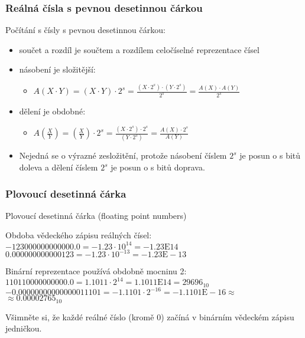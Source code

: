 \documentclass{beamer}
\begin{document}
\begin{frame}
\frametitle{Reálná čísla s pevnou desetinnou čárkou}

Počítání s čísly s pevnou desetinnou čárkou:

\begin{itemize}
\item součet a rozdíl je součtem a rozdílem celočíselné reprezentace čísel
\item násobení je složitější:
\begin{itemize}
\item $A(X \cdot Y) = (X \cdot Y ) \cdot 2^s = \frac{(X \cdot 2^s)\cdot( Y\cdot 2^s) }{2^s} = \frac{A(X) \cdot A(Y)}{2^s}$
\end{itemize}
\item dělení je obdobné:
\begin{itemize}
\item $A(\frac{X}{Y}) = (\frac{X}{Y}) \cdot 2^s = \frac{(X \cdot 2^s)\cdot2^s }{( Y\cdot 2^s)} = \frac{A(X) \cdot 2^s}{A(Y)}$
\end{itemize}
\item Nejedná se o výrazné zesložitění, protože násobení číslem $2^s$ je posun o s bitů doleva a dělení číslem $2^s$ je posun o s bitů doprava.
\end{itemize}



\end{frame}


\begin{frame}
\frametitle{Plovoucí desetinná čárka}

Plovoucí desetinná čárka (floating point numbers)

\bigskip

Obdoba vědeckého zápisu reálných čísel:
$-123 000 000 000 000.0 = -1.23 \cdot 10^{14} = -1.23\text{E} 14$\\
$0.000 000 000 000 123 = -1.23 \cdot 10^{-13} = -1.23\text{E}-13$\\

\bigskip

Binární reprezentace používá obdobně mocninu 2:\\
$110 1100 0000 0000.0 = 1.1011 \cdot 2^{14} = 1.1011\text{E} 14 = 29696_{10}$\\
$-0.0000 0000 0000 0001 1101 = -1.1101 \cdot 2^{-16} = -1.1101\text{E}-16 \approx$\\
\phantom{xxxxxxxxxxxxxxxxxxxxxxxxxxxxxxxxxxxxxxxxxx}$\approx0.00002765_{10}$\\

\bigskip

Všimněte si, že každé reálné číslo (kromě 0) začíná v binárním vědeckém zápisu jedničkou.


\end{frame}
\end{document}
